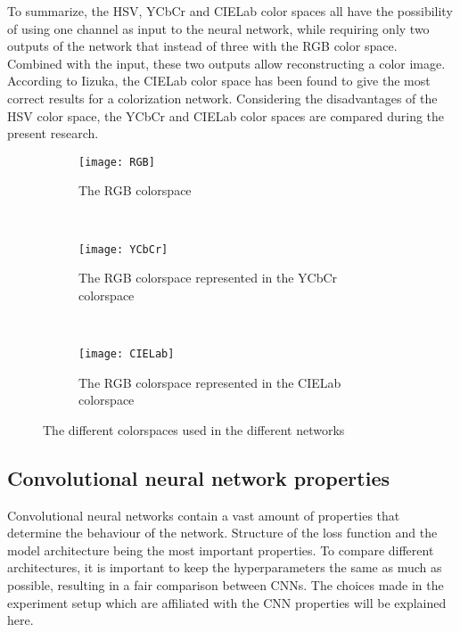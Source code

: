 To summarize, the HSV, YCbCr and CIELab color spaces all have the possibility of using one channel as input to the neural network, while requiring only two outputs of the network that instead of three with the RGB color space. Combined with the input, these two outputs allow reconstructing a color image. According to Iizuka, the CIELab color space has been found to give the most correct results for a colorization network\cite{IizukaSIGGRAPH2016}. Considering the disadvantages of the HSV color space, the YCbCr and CIELab color spaces are compared during the present research.

\begin{figure}
	\centering
	\begin{subfigure}[b]{0.32\textwidth}
		\texttt{[image: RGB]}
		\caption{The RGB colorspace}
		\label{fig:RGB}
	\end{subfigure}
	~ %
	\begin{subfigure}[b]{0.32\textwidth}
		\texttt{[image: YCbCr]}
		\caption{The RGB colorspace represented in the YCbCr colorspace}
		\label{fig:YCbCr}
	\end{subfigure}
	~ %
	\begin{subfigure}[b]{0.32\textwidth}
		\texttt{[image: CIELab]}
		\caption{The RGB colorspace represented in the CIELab colorspace}
		\label{fig:CIELab}
	\end{subfigure}
	\caption{The different colorspaces used in the different networks}\label{fig:animals}
\end{figure}

\subsection{Convolutional neural network properties}
\label{sec:nnproperties}

Convolutional neural networks contain a vast amount of properties that determine the behaviour of the network. Structure of the loss function and the model architecture being the most important properties. To compare different architectures, it is important to keep the hyperparameters the same as much as possible, resulting in a fair comparison between CNNs. The choices made in the experiment setup which are affiliated with the CNN properties will be explained here.

